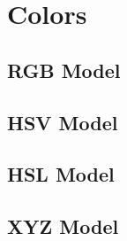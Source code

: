 \section{Colors}

\subsection{RGB Model}

\subsection{HSV Model}

\subsection{HSL Model}

\subsection{XYZ Model}

